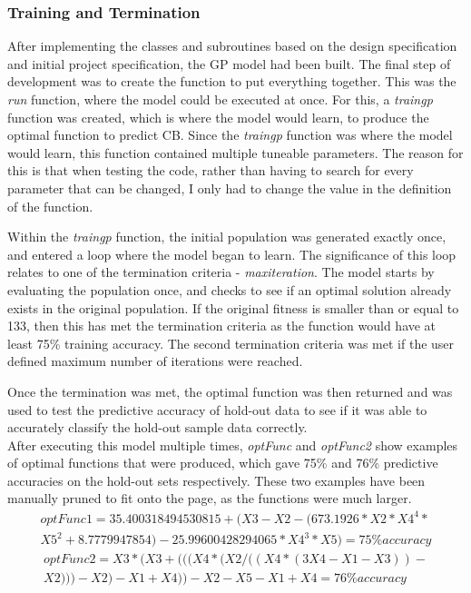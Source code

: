 \documentclass[11pt]{article}
\begin{document}
\subsubsection{Training and Termination}\label{subsubsec:TR}
After implementing the classes and subroutines based on the design specification and initial project specification, the GP model had been built. The final step of development was to create the function to put everything together. This was the \textit{run} function, where the model could be executed at once. For this, a \textit{train\textunderscore gp} function was created, which is where the model would learn, to produce the optimal function to predict CB. Since the \textit{train\textunderscore gp} function was where the model would learn, this function contained multiple tuneable parameters. The reason for this is that when testing the code, rather than having to search for every parameter that can be changed, I only had to change the value in the definition of the function.

Within the \textit{train\textunderscore gp} function, the initial population was generated exactly once, and entered a loop where the model began to learn. The significance of this loop relates to one of the termination criteria - \textit{max\textunderscore iteration}. The model starts by evaluating the population once, and checks to see if an optimal solution already exists in the original population. If the original fitness is smaller than or equal to 133, then this has met the termination criteria as the function would have at least 75\% training accuracy. The second termination criteria was met if the user defined maximum number of iterations were reached. 

Once the termination was met, the optimal function was then returned and was used to test the predictive accuracy of hold-out data to see if it was able to accurately classify the hold-out sample data correctly. \\

After executing this model multiple times, \textit{optFunc} and \textit{optFunc2} show examples of optimal functions that were produced, which gave 75\% and 76\% predictive accuracies on the hold-out sets respectively.  These two examples have been manually pruned to fit onto the page, as the functions were much larger. 
\begin{align*}
optFunc1=  35.400318494530815+(X3-X2-(673.1926*X2*X4^4*\\
X5^2+8.7779947854)-25.99600428294065*X4^3*X5) = 75\%  accuracy
\end{align*}
\begin{align*}
optFunc2 = X3*(X3+(((X4*(X2/((X4*(3X4-X1-X3))-\\
X2)))-X2)-X1+X4))-X2-X5-X1+X4 = 76\%  accuracy
\end{align*}
\end{document}
